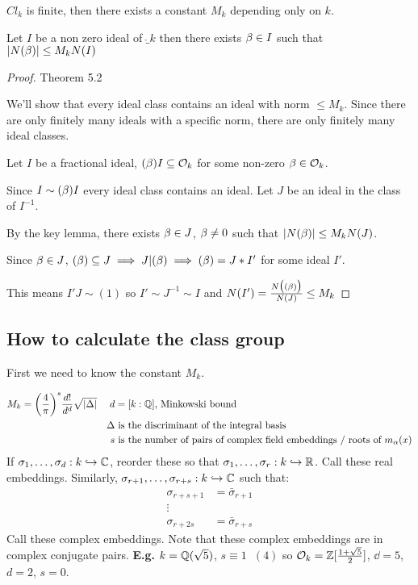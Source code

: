 \documentclass[11pt]{article}
\begin{document}
\begin{theorem}
$Cl_k$ is finite, then there exists a constant $M_k$ depending only on $k$.
\end{theorem}
\begin{lemma}
	Let $I$ be a non zero ideal of $\ring_k$ then there exists $\beta \in I$ such that $|N(\beta)| \leq M_kN(I)$
\end{lemma}
\begin{proof}
Theorem 5.2

We'll show that every ideal class contains an ideal with norm $\leq M_k$.
Since there are only finitely many ideals with a specific norm, there are only finitely many ideal classes.
\spa

	Let $I$ be a fractional ideal, $(\beta) I \subseteq \mathcal{O}_k$ for some non-zero $\beta \in \mathcal{O}_k$.
\spa

	Since  $I \sim (\beta) I$ every ideal class contains an ideal.
	Let $J$ be an ideal in the class of $I^{-1}$.
\spa

	By the key lemma, there exists $\beta \in J$, $\beta \neq 0$ such that $|N(\beta)| \leq M_k N(J)$. 
	\spa

	Since $\beta \in J$, $(\beta) \subseteq J \implies J | (\beta) \implies (\beta) = J*I'$ for some ideal $I'$.
\spa

	This means $I'J \sim (1)$ so $I' \sim J^{-1} \sim I$ and $N(I') = \frac{N\big((\beta)\big)}{N(J)} \leq M_k$




\end{proof}


\subsection{How to calculate the class group}

First we need to know the constant $M_k$.

\begin{align*}
	M_k = \bigg(\frac4\pi\bigg)^s \frac{d!}{d^d} \sqrt{|\Delta|} && d&=[k:\mathbb{Q}] \text{, Minkowski bound}\\
	&& \Delta& \text{ is the discriminant of the integral basis}\\
	&& s&  \text{ is the number of pairs of complex field embeddings / roots of $m_\alpha(x)$}
\end{align*}
\spac
If $\sigma_1, \dots, \sigma_d : k \hookrightarrow \mathbb{C}$, reorder these so that $\sigma_1, \dots, \sigma_r : k \hookrightarrow \mathbb{R}$.
Call these real embeddings.
Similarly,
$\sigma_{r+1} , \dots, \sigma_{r+s} : k \hookrightarrow \mathbb{C}$ such that:
\begin{align*}
	\sigma_{r+s+1} &= \bar \sigma_{r+1}\\
	\vdots &\\
	\sigma_{r+2s} & = \bar \sigma_{r+s}
\end{align*}
Call these complex embeddings. Note that these complex embeddings are in complex conjugate pairs.
\spac
\textbf{E.g.} $k = \mathbb{Q}(\sqrt{5} ) $, $s \equiv 1 \hspace{7pt} (4)$ so $\mathcal{O}_k = \mathbb{Z} [\frac{1+\sqrt{5}}{2}]$, $\dd = 5$, $d = 2$, $s =0$.
\end{document}
